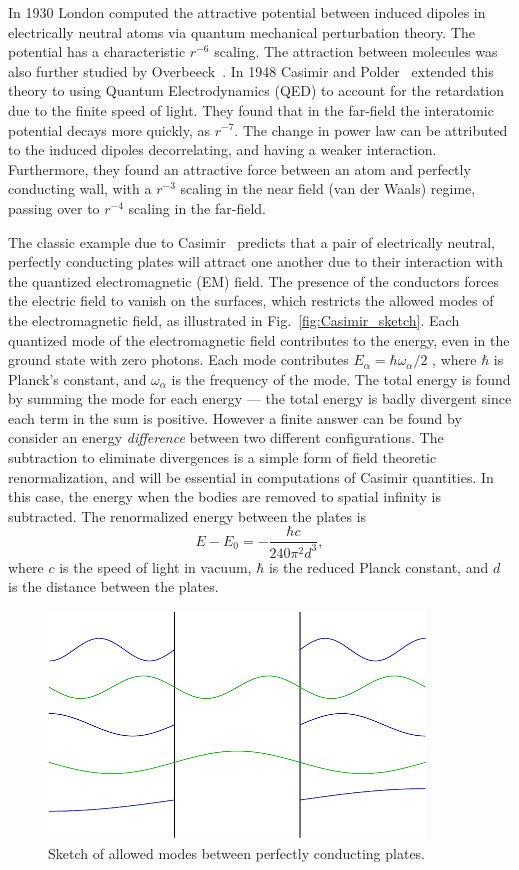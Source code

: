 In 1930 London computed the attractive potential between induced dipoles in electrically neutral
atoms via quantum mechanical perturbation theory.  The potential has a characteristic $r^{-6}$ scaling.
The attraction between molecules was also further studied by Overbeeck~\etal\cite{Overbeeck}.  
In 1948 Casimir and Polder~\cite{CasimirPolder1948} extended this theory to using Quantum Electrodynamics
(QED) to account for the retardation due to the finite speed of light.  They found that in the 
far-field the interatomic potential decays more quickly, as $r^{-7}$.  The change in power law can be 
attributed to the induced dipoles decorrelating, and having a weaker interaction.  Furthermore,
they found an attractive force between an atom and perfectly conducting wall, with a $r^{-3}$ scaling
in the near field (van der Waals) regime, passing over to $r^{-4}$ scaling in the far-field.    

The classic example due to Casimir~\cite{Casimir1948} predicts that a pair of electrically neutral,
perfectly conducting plates will attract one another due to their interaction with the quantized 
electromagnetic (EM) field.  
The presence of the conductors forces the electric field to vanish on the surfaces,
which restricts the allowed modes of the electromagnetic field, as illustrated in Fig.~\ref{fig:Casimir_sketch}.
Each quantized mode of the electromagnetic field contributes
to the energy, even in the ground state with zero photons.  Each mode contributes 
$E_\alpha=\hbar\omega_\alpha/2$ , where $\hbar$ is Planck's  constant, and $\omega_\alpha$ is the frequency of the mode.
The total energy is found by summing the mode for each energy --- the total energy is
badly divergent since each term in the sum is positive.  However a finite answer can 
be found by consider an energy \emph{difference} between two different configurations.  
The subtraction to eliminate divergences is a simple form of field theoretic renormalization, 
and will be essential in computations of Casimir quantities.  
In this case, the energy when the bodies are removed to spatial infinity is subtracted.  
The renormalized energy between the plates is
\begin{equation}
  E-E_0 = -\frac{\hbar c}{240\pi^2 d^3},
\end{equation}
where $c$ is the speed of light in vacuum, $\hbar$ is the reduced Planck constant,
and $d$ is the distance between the plates.  
\begin{figure}
\center
\includegraphics[width=10cm]{fig/intro/twoplanes_wave}
\caption{Sketch of allowed modes between perfectly conducting plates.}
\label{fig:Casimir_plates}
\end{figure}

